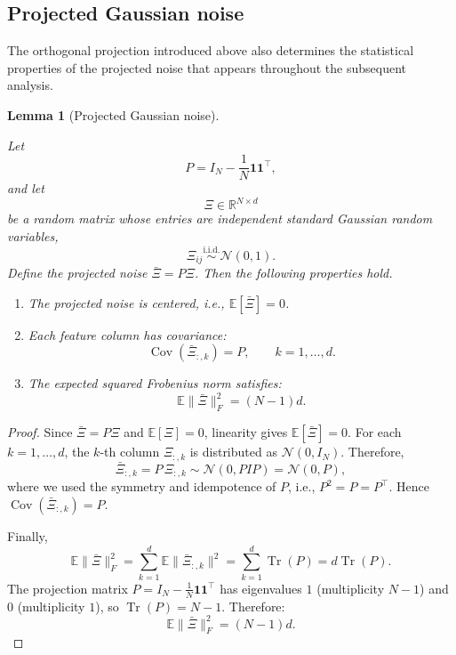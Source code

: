 \documentclass{article}
\newtheorem{lemma}[theorem]{Lemma}
\begin{document}
\subsection{Projected Gaussian noise}

The orthogonal projection introduced above also determines the statistical
properties of the projected noise that appears throughout the subsequent
analysis.

\begin{lemma}[Projected Gaussian noise]
	\label{lem:projected_noise}
	
	Let
	\[
	P = I_N - \frac1N \mathbf1\mathbf1^\top,
	\]
	and let
	\[
	\Xi \in \mathbb R^{N\times d}
	\]
	be a random matrix whose entries are independent standard Gaussian random variables,
	\[
	\Xi_{ij} \stackrel{\mathrm{i.i.d.}}{\sim} \mathcal N(0,1).
	\]
	Define the projected noise $\bar\Xi = P\Xi$.
	Then the following properties hold.
	\begin{enumerate}
		\item The projected noise is centered, i.e., $\mathbb E[\bar\Xi] = 0$.
		\item Each feature column has covariance:
		\[
		\operatorname{Cov}(\bar\Xi_{:,k}) = P, \qquad k=1,\dots,d.
		\]
		\item The expected squared Frobenius norm satisfies:
		\[
		\boxed{\mathbb E\|\bar\Xi\|_F^2 = (N-1)d.}
		\]
	\end{enumerate}
\end{lemma}

\begin{proof}
	Since   $\bar\Xi = P\Xi$ and $\mathbb E[\Xi]=0$, linearity gives $\mathbb E[\bar\Xi]=0$.	
	For each $k=1,\dots,d$, the $k$-th column $\Xi_{:,k}$ is distributed as $\mathcal N(0,I_N)$. Therefore,
	\[
	\bar\Xi_{:,k} = P\,\Xi_{:,k} \sim \mathcal N(0,PIP) = \mathcal N(0,P),
	\]
	where we used the symmetry and idempotence of $P$, i.e., $P^2 = P = P^\top$.
	Hence $\operatorname{Cov}(\bar\Xi_{:,k}) = P$.
	
	Finally,
	\[
	\mathbb E\|\bar\Xi\|_F^2 = \sum_{k=1}^{d} \mathbb E\|\bar\Xi_{:,k}\|^2
	= \sum_{k=1}^{d} \operatorname{Tr}(P)
	= d\operatorname{Tr}(P).
	\]
	The projection matrix $P = I_N - \frac1N\mathbf1\mathbf1^\top$ has eigenvalues
	$1$ (multiplicity $N-1$) and $0$ (multiplicity $1$), so $\operatorname{Tr}(P) = N-1$.
	Therefore:
	\[\mathbb E\|\bar\Xi\|_F^2 = (N-1)d. \]
\end{proof}
\end{document}
